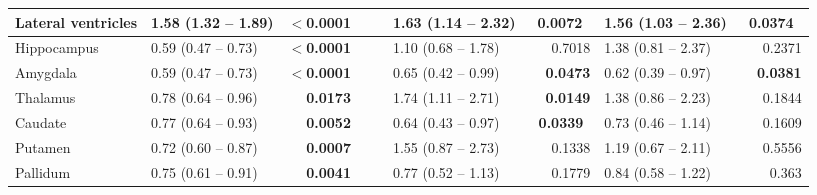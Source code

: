 \begin{sidewaystable}
{\begin{tabular}{|l|lr|lr|lr|lr|}
\hline
Lateral ventricles & \textcolor[rgb]{0.2,0.2,0.2}{1.58 (1.32 -- 1.89)} & \textbf{$<$0.0001} & {\cellcolor[rgb]{0.753,0.753,0.753}} & {\cellcolor[rgb]{0.753,0.753,0.753}} & \textcolor[rgb]{0.2,0.2,0.2}{1.63 (1.14 -- 2.32)~} & \textcolor[rgb]{0.2,0.2,0.2}{\textbf{0.0072~}} & \textcolor[rgb]{0.2,0.2,0.2}{1.56 (1.03 -- 2.36)~} & \textcolor[rgb]{0.2,0.2,0.2}{\textbf{0.0374}~} \\ 
\hline
Hippocampus & \textcolor[rgb]{0.2,0.2,0.2}{0.59 (0.47 -- 0.73)} & \textbf{$<$0.0001} & {\cellcolor[rgb]{0.753,0.753,0.753}} & {\cellcolor[rgb]{0.753,0.753,0.753}} & \textcolor[rgb]{0.2,0.2,0.2}{1.10 (0.68 -- 1.78)~} & \textcolor[rgb]{0.2,0.2,0.2}{0.7018} & \textcolor[rgb]{0.2,0.2,0.2}{1.38 (0.81 -- 2.37)~} & \textcolor[rgb]{0.2,0.2,0.2}{0.2371} \\ 
\hline
Amygdala & \textcolor[rgb]{0.2,0.2,0.2}{0.59 (0.47 -- 0.73)} & \textbf{$<$0.0001} & {\cellcolor[rgb]{0.753,0.753,0.753}} & {\cellcolor[rgb]{0.753,0.753,0.753}} & \textcolor[rgb]{0.2,0.2,0.2}{0.65 (0.42 -- 0.99)~} & \textcolor[rgb]{0.2,0.2,0.2}{\textbf{0.0473}} & \textcolor[rgb]{0.2,0.2,0.2}{0.62 (0.39 -- 0.97)~} & \textcolor[rgb]{0.2,0.2,0.2}{\textbf{0.0381}} \\ 
\hline
Thalamus & \textcolor[rgb]{0.2,0.2,0.2}{0.78 (0.64 -- 0.96)} & \textcolor[rgb]{0.2,0.2,0.2}{\textbf{0.0173}} & {\cellcolor[rgb]{0.753,0.753,0.753}} & {\cellcolor[rgb]{0.753,0.753,0.753}} & \textcolor[rgb]{0.2,0.2,0.2}{1.74 (1.11 -- 2.71)~} & \textcolor[rgb]{0.2,0.2,0.2}{\textbf{0.0149}} & \textcolor[rgb]{0.2,0.2,0.2}{1.38 (0.86 -- 2.23)~} & \textcolor[rgb]{0.2,0.2,0.2}{0.1844} \\ 
\hline
Caudate & \textcolor[rgb]{0.2,0.2,0.2}{0.77 (0.64 -- 0.93)} & \textcolor[rgb]{0.2,0.2,0.2}{\textbf{0.0052}} & {\cellcolor[rgb]{0.753,0.753,0.753}} & {\cellcolor[rgb]{0.753,0.753,0.753}} & \textcolor[rgb]{0.2,0.2,0.2}{0.64 (0.43 -- 0.97)~} & \textcolor[rgb]{0.2,0.2,0.2}{\textbf{0.0339}~} & \textcolor[rgb]{0.2,0.2,0.2}{0.73 (0.46 -- 1.14)~} & \textcolor[rgb]{0.2,0.2,0.2}{0.1609} \\ 
\hline
Putamen & \textcolor[rgb]{0.2,0.2,0.2}{0.72 (0.60 -- 0.87)} & \textcolor[rgb]{0.2,0.2,0.2}{\textbf{0.0007}} & {\cellcolor[rgb]{0.753,0.753,0.753}} & {\cellcolor[rgb]{0.753,0.753,0.753}} & \textcolor[rgb]{0.2,0.2,0.2}{1.55 (0.87 -- 2.73)~} & \textcolor[rgb]{0.2,0.2,0.2}{0.1338} & \textcolor[rgb]{0.2,0.2,0.2}{1.19 (0.67 -- 2.11)~} & \textcolor[rgb]{0.2,0.2,0.2}{0.5556} \\ 
\hline
Pallidum & \textcolor[rgb]{0.2,0.2,0.2}{0.75 (0.61 -- 0.91)} & \textcolor[rgb]{0.2,0.2,0.2}{\textbf{0.0041}} & {\cellcolor[rgb]{0.753,0.753,0.753}} & {\cellcolor[rgb]{0.753,0.753,0.753}} & \textcolor[rgb]{0.2,0.2,0.2}{0.77 (0.52 -- 1.13)~} & \textcolor[rgb]{0.2,0.2,0.2}{0.1779} & \textcolor[rgb]{0.2,0.2,0.2}{0.84 (0.58 -- 1.22)~} & \textcolor[rgb]{0.2,0.2,0.2}{0.363} \\ 

\end{tabular}}
\end{sidewaystable}
